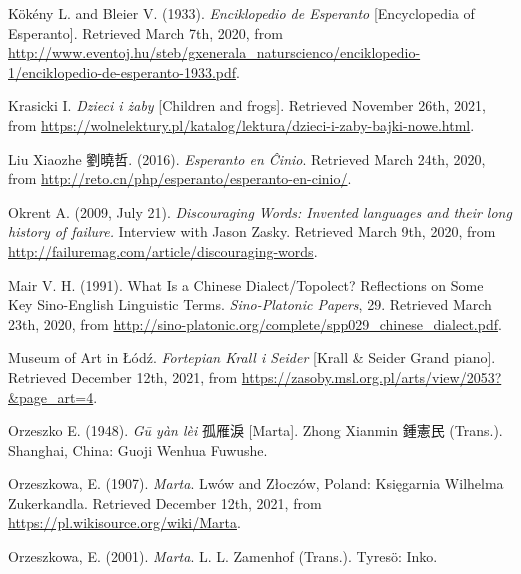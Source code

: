 Kökény L. and Bleier V. (1933). \textit{Enciklopedio de Esperanto} [Encyclopedia of Esperanto]. Retrieved March 7th, 2020, from \url{http://www.eventoj.hu/steb/gxenerala_naturscienco/enciklopedio-1/enciklopedio-de-esperanto-1933.pdf}.

Krasicki I. \textit{Dzieci i żaby} [Children and frogs]. Retrieved November 26th, 2021, from \url{https://wolnelektury.pl/katalog/lektura/dzieci-i-zaby-bajki-nowe.html}.


Liu Xiaozhe 劉曉哲. (2016). \textit{Esperanto en Ĉinio}. Retrieved March 24th, 2020, from \url{http://reto.cn/php/esperanto/esperanto-en-cinio/}.


Okrent A. (2009, July 21). \textit{Discouraging Words: Invented languages and their long history of failure.} Interview with Jason Zasky. Retrieved March 9th, 2020, from \url{http://failuremag.com/article/discouraging-words}.

Mair V. H. (1991). What Is a Chinese Dialect/Topolect? Reflections on Some Key Sino-English Linguistic Terms. \textit{Sino-Platonic Papers}, 29. Retrieved March 23th, 2020, from \url{http://sino-platonic.org/complete/spp029_chinese_dialect.pdf}.

Museum of Art in Łódź. \textit{Fortepian Krall i Seider} [Krall \& Seider Grand piano]. Retrieved December 12th, 2021, from \url{https://zasoby.msl.org.pl/arts/view/2053?&page_art=4}.

Orzeszko E. (1948). \textit{Gū yàn lèi} 孤雁淚 [Marta]. Zhong Xianmin 鍾憲民 (Trans.). Shanghai, China: Guoji Wenhua Fuwushe.

Orzeszkowa, E. (1907). \textit{Marta}. Lwów and Złoczów, Poland: Księgarnia Wilhelma Zukerkandla. Retrieved December 12th, 2021, from \url{https://pl.wikisource.org/wiki/Marta}.

Orzeszkowa, E. (2001). \textit{Marta}. L. L. Zamenhof (Trans.). Tyresö: Inko.


